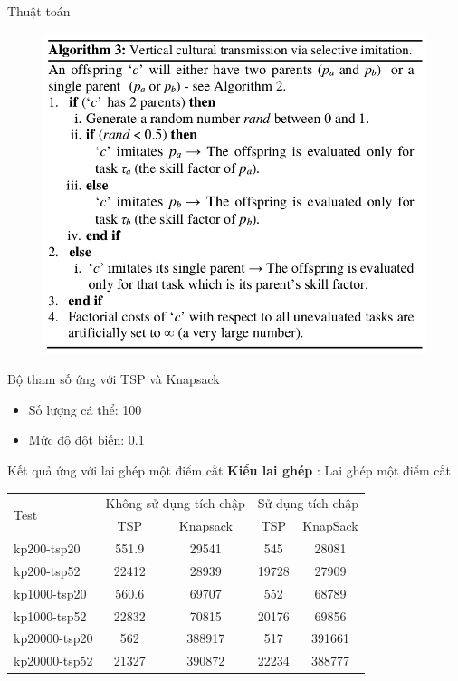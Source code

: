 \documentclass[compress]{beamer}
\begin{document}
\begin{frame}{Thuật toán}
\begin{figure}
\includegraphics[scale=0.42]{al3.png}
\end{figure}
\end{frame}
\begin{frame}{Bộ tham số ứng với TSP và Knapsack}
\begin{itemize}
\item Số lượng cá thể: 100
\item Mức độ đột biến: 0.1
\end{itemize}
\end{frame}
\begin{frame}{Kết quả ứng với lai ghép một điểm cắt}
\textbf{Kiểu lai ghép} : Lai ghép một điểm cắt


\begin{longtable}{|l |c |c |c |c|}
\hline
\multirow{2}{*}{Test} 
& \multicolumn{2}{c|}{Không sử dụng tích chập} &\multicolumn{2}{|c|}{Sử dụng tích chập} \\
\cline{2-5}
&TSP & Knapsack & TSP & KnapSack \\
\hline
kp200-tsp20  & 551.9&29541 &545 &28081 
\\ \hline
kp200-tsp52&22412 &28939&19728 &27909 \\ \hline
kp1000-tsp20 &560.6&69707&552&68789 \\ \hline
kp1000-tsp52 &22832&70815&20176&69856 \\ \hline
kp20000-tsp20 &562&388917&517 &391661 \\ \hline
kp20000-tsp52 &21327&390872&22234& 388777\\ \hline
\end{longtable}
\end{frame}
\end{document}
